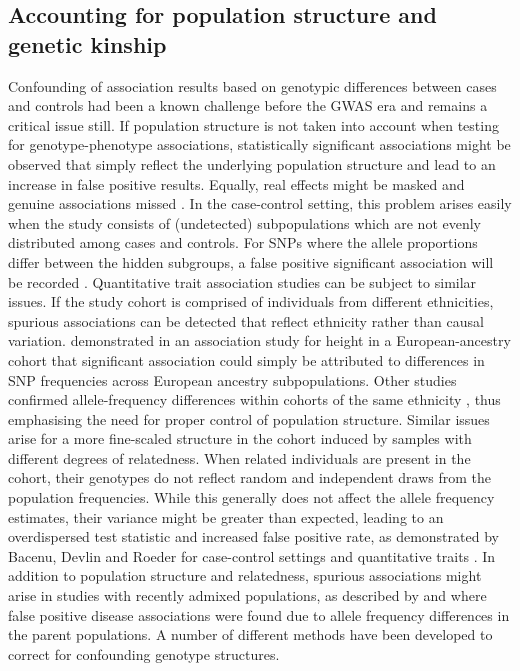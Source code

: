 \subsection{Accounting for population structure and genetic kinship}
\label{subsection:population-structure}

Confounding of association results based on genotypic differences between cases and controls had been a known challenge before the GWAS era \citep{Spielman1993} and remains a critical issue still. If population structure is not taken into account when testing for genotype-phenotype associations, statistically significant associations might be observed that simply reflect the underlying population structure and lead to an increase in false positive results. Equally, real effects might be masked and genuine associations missed \citep{Marchini2004}. In the case-control setting, this problem arises easily when the study consists of (undetected) subpopulations which are not evenly distributed among cases and controls. For SNPs where the allele proportions differ between the hidden subgroups, a false positive significant association will be recorded \citep{Marchini2004,Balding2006}. Quantitative trait association studies can be subject to similar issues. If the study cohort is comprised of individuals from different ethnicities, spurious associations can be detected that reflect ethnicity rather than causal variation. \citet{Campbell2005} demonstrated in an association study for height in a European-ancestry cohort that significant association could simply be attributed to differences in SNP frequencies across European ancestry subpopulations.  Other studies confirmed allele-frequency differences within cohorts of the same ethnicity \citep{Tian2008a,Tian2008b}, thus emphasising the need for proper control of population structure. Similar issues arise for a more fine-scaled structure in the cohort induced by samples with different degrees of relatedness. When related individuals are present in the cohort, their genotypes do not reflect random and independent draws from the population frequencies. While this generally does not affect the allele frequency estimates, their variance might be greater than expected, leading to an overdispersed test statistic and increased false positive rate, as demonstrated by Bacenu, Devlin and Roeder for case-control settings and quantitative traits \citep{Devlin1999, Bacanu2002}. In addition to population structure and relatedness, spurious associations might arise in studies with recently admixed populations, as described by \citet{Lander1994} and \citet{Ewens1995} where false positive disease associations were found due to allele frequency differences in the parent populations. A number of different methods have been developed to correct for confounding genotype structures.

